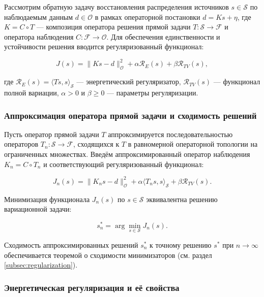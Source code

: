 \documentclass[a4paper,14pt,oneside,openany]{extarticle}
\begin{document}
Рассмотрим обратную задачу восстановления распределения источников $s \in \mathcal{S}$ по наблюдаемым данным $d \in \mathcal{O}$ в рамках операторной постановки $d = Ks + \eta$, где $K = C \circ T$ --- композиция оператора решения прямой задачи $T: \mathcal{S} \to \mathcal{F}$ и оператора наблюдения $C: \mathcal{F} \to \mathcal{O}$. Для обеспечения единственности и устойчивости решения вводится регуляризованный функционал:

\begin{equation}
    J(s) = \|Ks - d\|_{\mathcal{O}}^2 + \alpha \mathcal{R}_E(s) + \beta \mathcal{R}_{TV}(s),
\end{equation}

где $\mathcal{R}_E(s) = \langle Ts, s \rangle_{\mathcal{S}}$ --- энергетический регуляризатор, $\mathcal{R}_{TV}(s)$ --- функционал полной вариации, $\alpha > 0$ и $\beta \geq 0$ --- параметры регуляризации.

\subsubsection{Аппроксимация оператора прямой задачи и сходимость решений}

Пусть оператор прямой задачи $T$ аппроксимируется последовательностью операторов $T_n: \mathcal{S} \to \mathcal{F}$, сходящихся к $T$ в равномерной операторной топологии на ограниченных множествах. Введём аппроксимированный оператор наблюдения $K_n = C \circ T_n$ и соответствующий регуляризованный функционал:

\begin{equation}
    J_n(s) = \|K_n s - d\|_{\mathcal{O}}^2 + \alpha \langle T_n s, s \rangle_{\mathcal{S}} + \beta \mathcal{R}_{TV}(s).
\end{equation}

Минимизация функционала $J_n(s)$ по $s \in \mathcal{S}$ эквивалентна решению вариационной задачи:

\begin{equation}
    s_n^* = \arg\min_{s \in \mathcal{S}} J_n(s).
\end{equation}

Сходимость аппроксимированных решений $s_n^*$ к точному решению $s^*$ при $n \to \infty$ обеспечивается теоремой о сходимости минимизаторов (см. раздел \ref{subsec:regularization}).

\subsubsection{Энергетическая регуляризация и её свойства}
\end{document}
